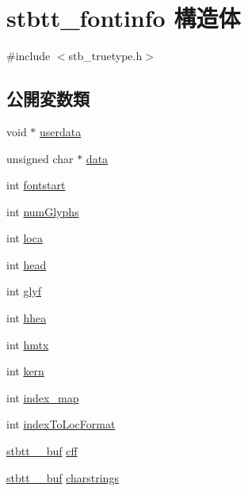 \hypertarget{structstbtt__fontinfo}{}\section{stbtt\+\_\+fontinfo 構造体}
\label{structstbtt__fontinfo}


{\ttfamily \#include $<$stb\+\_\+truetype.\+h$>$}

\subsection*{公開変数類}
\begin{DoxyCompactItemize}
\item 
void $\ast$ \mbox{\hyperlink{structstbtt__fontinfo_a9c81078df96a7a3f730137151efab285}{userdata}}
\item 
unsigned char $\ast$ \mbox{\hyperlink{structstbtt__fontinfo_af348db379cf0e0e71a68603d00501d41}{data}}
\item 
int \mbox{\hyperlink{structstbtt__fontinfo_a139234d825b585afa27748a1f3d10c7d}{fontstart}}
\item 
int \mbox{\hyperlink{structstbtt__fontinfo_a60ad8301a98eb7cd91472ce846d9080d}{num\+Glyphs}}
\item 
int \mbox{\hyperlink{structstbtt__fontinfo_a15344195b181b50bde4f59ae7ca248c0}{loca}}
\item 
int \mbox{\hyperlink{structstbtt__fontinfo_ab76ed2f4cbd8fcbd8465ca5f88e7e2b9}{head}}
\item 
int \mbox{\hyperlink{structstbtt__fontinfo_a5de2129e0a415748920f6aa10ceee6e5}{glyf}}
\item 
int \mbox{\hyperlink{structstbtt__fontinfo_a91b82ae03d68892eb7f3fbd3a8b990e5}{hhea}}
\item 
int \mbox{\hyperlink{structstbtt__fontinfo_aebf42701e99b88d07a59bf99cb84b9a1}{hmtx}}
\item 
int \mbox{\hyperlink{structstbtt__fontinfo_a57cc83512daea60e97ed49354d634d37}{kern}}
\item 
int \mbox{\hyperlink{structstbtt__fontinfo_a0b95e3ac0c397b72b7696ce6696eb189}{index\+\_\+map}}
\item 
int \mbox{\hyperlink{structstbtt__fontinfo_a5fa117a7ef058111a70a5b0b87d220f4}{index\+To\+Loc\+Format}}
\item 
\mbox{\hyperlink{structstbtt____buf}{stbtt\+\_\+\+\_\+buf}} \mbox{\hyperlink{structstbtt__fontinfo_a6031b4bda94aa2b5ff07ef5d626a15a4}{cff}}
\item 
\mbox{\hyperlink{structstbtt____buf}{stbtt\+\_\+\+\_\+buf}} \mbox{\hyperlink{structstbtt__fontinfo_aaf04a69f8dd4b6a8bed4191b57145082}{charstrings}}

\end{DoxyCompactItemize}
